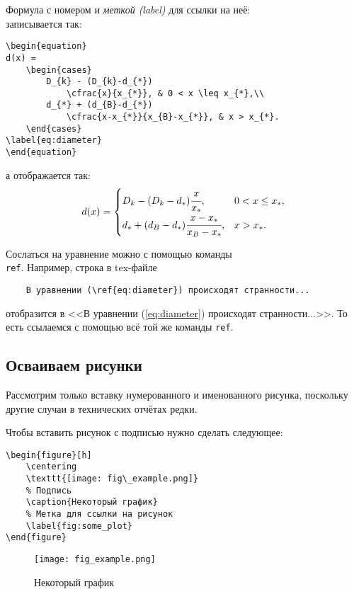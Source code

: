 \documentclass[../homework.tex]{subfiles}
\begin{document}
Формула с номером и \textit{меткой (label)} для ссылки на неё:\\
записывается так:
\begin{verbatim}
\begin{equation}
d(x) =
    \begin{cases}
        D_{k} - (D_{k}-d_{*})
            \cfrac{x}{x_{*}}, & 0 < x \leq x_{*},\\
        d_{*} + (d_{B}-d_{*})
            \cfrac{x-x_{*}}{x_{B}-x_{*}}, & x > x_{*}.
    \end{cases}
\label{eq:diameter}
\end{equation}
\end{verbatim}
а отображается так:
%
\begin{equation}
    d(x) =
        \begin{cases}
            D_{k} - (D_{k}-d_{*}) \cfrac{x}{x_{*}}, & 0 < x \leq x_{*},\\
            d_{*} + (d_{B}-d_{*}) \cfrac{x-x_{*}}{x_{B}-x_{*}}, & x > x_{*}.
        \end{cases}
    \label{eq:diameter}
\end{equation}

Сослаться на уравнение можно с помощью команды \texttt{\\ref}.
Например, строка в tex-файле
\begin{verbatim}
    В уравнении (\ref{eq:diameter}) происходят странности...
\end{verbatim}
отобразится в <<В уравнении (\ref{eq:diameter}) происходят странности...>>.
То есть ссылаемся с помощью всё той же команды \texttt{ref}.


\subsection{Осваиваем рисунки}

Рассмотрим только вставку нумерованного и именованного рисунка, поскольку другие случаи в технических отчётах редки.

Чтобы вставить рисунок с подписью нужно сделать следующее:
\begin{verbatim}
\begin{figure}[h]
    \centering
    \texttt{[image: fig\_example.png]}
    % Подпись
    \caption{Некоторый график}
    % Метка для ссылки на рисунок
    \label{fig:some_plot}
\end{figure}
\end{verbatim}
%
\begin{figure}[h]
    \centering
    \texttt{[image: fig\_example.png]}
    \caption{Некоторый график}
    \label{fig:some_plot}
\end{figure}
\end{document}

